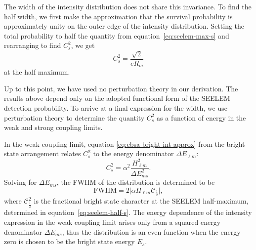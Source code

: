 The width of the intensity distribution does not share this
invariance.  To find the half width, we first make the approximation
that the survival probability is approximately unity on the outer edge
of the intensity distribution. Setting the total probability to half
the quantity from equation~\ref{eq:seelem-max-s} and rearranging to
find $C_s^2$, we get
\begin{equation}
  \label{eq:seelem-half-s}
  C_s^2 = \frac{\sqrt{2}}{e R_m} 
\end{equation}
at the half maximum.

Up to this point, we have used no perturbation theory in our
derivation. The results above depend only on the adopted functional
form of the SEELEM detection probability.  To arrive at a final
expression for the width, we use perturbation theory to determine the
quantity $C_s^2$ as a function of energy in the weak and strong
coupling limits.

In the weak coupling limit, equation \ref{eq:ebsa-bright-int-approx}
from the bright state arrangement relates $C_s^2$ to the energy
denominator $\Delta E_{\ell m}$:
\begin{equation}
  C_s^2 = \alpha^2 \frac{H_{\ell m}^2}{\Delta E_{ms}^2}.
\end{equation}
Solving for $\Delta E_{ms}$, the FWHM of the distribution
is determined to be
\begin{equation}
  \label{eq:seelem-weak-fwhm}
  \text{FWHM} = 2 \lvert \alpha H_{\ell m} \mathcal{C}_{\frac{1}{2}}\rvert,
\end{equation}
where $\mathcal{C}_{\frac{1}{2}}^2$ is the fractional bright state
character at the SEELEM half-maximum, determined in
equation~\ref{eq:seelem-half-s}.  The energy dependence of the
intensity expression in the weak coupling limit arises only from a
squared energy denominator $\Delta E_{ms}$, thus the distribution is
an even function when the energy zero is chosen to be the bright state
energy $E_s$.

